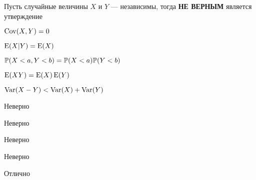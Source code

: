 
\begin{question}
Пусть случайные величины \(X\) и \(Y\) — независимы, тогда
\textbf{НЕ ВЕРНЫМ} является утверждение
\begin{answerlist}
  \item \(\Cov(X,Y) = 0\)
  \item \(\E(X|Y)=\E(X)\)
  \item \(\P(X<a, Y<b)=\P(X<a)\P(Y<b)\)
  \item \(\E(XY)=\E(X)\E(Y)\)
  \item \(\Var(X-Y)<\Var(X)+\Var(Y)\)
\end{answerlist}
\end{question}

\begin{solution}
\begin{answerlist}
  \item Неверно
  \item Неверно
  \item Неверно
  \item Неверно
  \item Отлично
\end{answerlist}
\end{solution}


